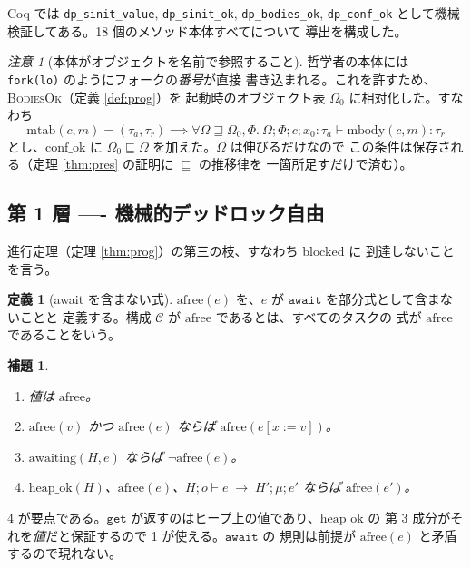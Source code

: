 \documentclass[11pt,a4paper]{ltjsarticle}
\newtheorem{lemma}[theorem]{補題}
\theoremstyle{definition}
\newtheorem{definition}[theorem]{定義}
\theoremstyle{remark}
\newtheorem{remark}[theorem]{注意}
\newcommand{\Om}{\Omega}          %
\newcommand{\Ph}{\Phi}            %
\newcommand{\jt}[3]{\Om;\Ph;#1;#2 \vdash #3}
\newcommand{\mtab}{\mathrm{mtab}}
\newcommand{\mbody}{\mathrm{mbody}}
\newcommand{\subs}[2]{[#1 := #2]}
\newcommand{\tstep}[6]{#1; #2 \vdash #3 \;\longrightarrow\; #4; #5; #6}
\newcommand{\heapok}{\mathrm{heap\_ok}}
\newcommand{\confok}{\mathrm{conf\_ok}}
\newcommand{\awaiting}{\mathrm{awaiting}}
\begin{document}
Coq では \verb|dp_sinit_value|, \verb|dp_sinit_ok|, \verb|dp_bodies_ok|,
\verb|dp_conf_ok| として機械検証してある。18 個のメソッド本体すべてについて
導出を構成した。

\begin{remark}[本体がオブジェクトを名前で参照すること]
哲学者の本体には \texttt{fork(lo)} のようにフォークの\emph{番号}が直接
書き込まれる。これを許すため、\textsc{BodiesOk}（定義 \ref{def:prog}）を
起動時のオブジェクト表 $\Om_0$ に相対化した。すなわち
\[
\mtab(c,m) = (\tau_a,\tau_r) \implies
\forall \Om \sqsupseteq \Om_0, \Ph.\ \jt{c}{x_0{:}\tau_a}{\mbody(c,m) : \tau_r}
\]
とし、$\confok$ に $\Om_0 \sqsubseteq \Om$ を加えた。$\Om$ は伸びるだけなので
この条件は保存される（定理 \ref{thm:pres} の証明に $\sqsubseteq$ の推移律を
一箇所足すだけで済む）。
\end{remark}

\subsection{第 1 層 ---- 機械的デッドロック自由}

進行定理（定理 \ref{thm:prog}）の第三の枝、すなわち $\mathrm{blocked}$ に
到達しないことを言う。

\begin{definition}[await を含まない式]
$\mathrm{afree}(e)$ を、$e$ が $\mathtt{await}$ を部分式として含まないことと
定義する。構成 $\mathcal{C}$ が $\mathrm{afree}$ であるとは、すべてのタスクの
式が $\mathrm{afree}$ であることをいう。
\end{definition}

\begin{lemma}
\label{lem:afree}
\begin{enumerate}
\item 値は $\mathrm{afree}$。
\item $\mathrm{afree}(v)$ かつ $\mathrm{afree}(e)$ ならば
      $\mathrm{afree}(e\subs{x}{v})$。
\item $\awaiting(H,e)$ ならば $\lnot\mathrm{afree}(e)$。
\item $\heapok(H)$、$\mathrm{afree}(e)$、$\tstep{H}{o}{e}{H'}{\mu}{e'}$ ならば
      $\mathrm{afree}(e')$。
\end{enumerate}
\end{lemma}

4 が要点である。$\mathtt{get}$ が返すのはヒープ上の値であり、$\heapok$ の
第 3 成分がそれを\emph{値}だと保証するので 1 が使える。$\mathtt{await}$ の
規則は前提が $\mathrm{afree}(e)$ と矛盾するので現れない。
\end{document}
